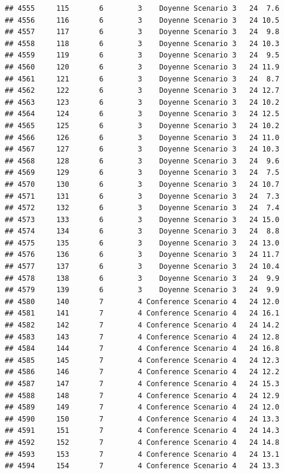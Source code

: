 \documentclass[
]{article}
\begin{document}
\begin{verbatim}
## 4555     115       6        3    Doyenne Scenario 3   24  7.6
## 4556     116       6        3    Doyenne Scenario 3   24 10.5
## 4557     117       6        3    Doyenne Scenario 3   24  9.8
## 4558     118       6        3    Doyenne Scenario 3   24 10.3
## 4559     119       6        3    Doyenne Scenario 3   24  9.5
## 4560     120       6        3    Doyenne Scenario 3   24 11.9
## 4561     121       6        3    Doyenne Scenario 3   24  8.7
## 4562     122       6        3    Doyenne Scenario 3   24 12.7
## 4563     123       6        3    Doyenne Scenario 3   24 10.2
## 4564     124       6        3    Doyenne Scenario 3   24 12.5
## 4565     125       6        3    Doyenne Scenario 3   24 10.2
## 4566     126       6        3    Doyenne Scenario 3   24 11.0
## 4567     127       6        3    Doyenne Scenario 3   24 10.3
## 4568     128       6        3    Doyenne Scenario 3   24  9.6
## 4569     129       6        3    Doyenne Scenario 3   24  7.5
## 4570     130       6        3    Doyenne Scenario 3   24 10.7
## 4571     131       6        3    Doyenne Scenario 3   24  7.3
## 4572     132       6        3    Doyenne Scenario 3   24  7.4
## 4573     133       6        3    Doyenne Scenario 3   24 15.0
## 4574     134       6        3    Doyenne Scenario 3   24  8.8
## 4575     135       6        3    Doyenne Scenario 3   24 13.0
## 4576     136       6        3    Doyenne Scenario 3   24 11.7
## 4577     137       6        3    Doyenne Scenario 3   24 10.4
## 4578     138       6        3    Doyenne Scenario 3   24  9.9
## 4579     139       6        3    Doyenne Scenario 3   24  9.9
## 4580     140       7        4 Conference Scenario 4   24 12.0
## 4581     141       7        4 Conference Scenario 4   24 16.1
## 4582     142       7        4 Conference Scenario 4   24 14.2
## 4583     143       7        4 Conference Scenario 4   24 12.8
## 4584     144       7        4 Conference Scenario 4   24 16.8
## 4585     145       7        4 Conference Scenario 4   24 12.3
## 4586     146       7        4 Conference Scenario 4   24 12.2
## 4587     147       7        4 Conference Scenario 4   24 15.3
## 4588     148       7        4 Conference Scenario 4   24 12.9
## 4589     149       7        4 Conference Scenario 4   24 12.0
## 4590     150       7        4 Conference Scenario 4   24 13.3
## 4591     151       7        4 Conference Scenario 4   24 14.3
## 4592     152       7        4 Conference Scenario 4   24 14.8
## 4593     153       7        4 Conference Scenario 4   24 13.1
## 4594     154       7        4 Conference Scenario 4   24 13.3

\end{verbatim}
\end{document}
